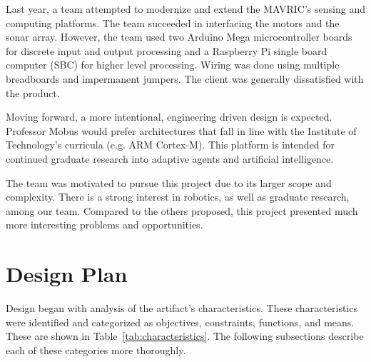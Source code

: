\documentclass{article}
\begin{document}
    Last year, a team attempted to modernize
    and extend the MAVRIC's sensing and computing platforms.\cite{mobot}
    The team succeeded in interfacing the motors and the sonar array.
    However, the team used two Arduino Mega microcontroller boards
    for discrete input and output processing
    and a Raspberry Pi single board computer (SBC) for higher level processing.
    Wiring was done using multiple breadboards and impermanent jumpers.
    The client was generally dissatisfied with the product.

    Moving forward, a more intentional, engineering driven design is expected.
    Professor Mobus would prefer architectures          %
    that fall in line with the Institute of Technology's curricula
    (e.g. ARM Cortex-M).
    This platform is intended for continued graduate research
    into adaptive agents and artificial intelligence.

    The team was motivated to pursue this project
    due to its larger scope and complexity.
    There is a strong interest in robotics, as well as graduate research,
    among our team.
    Compared to the others proposed,
    this project presented much more interesting problems and opportunities.

\FloatBarrier
\section{Design Plan} %
    \label{sec:design_plan}

    Design began with analysis of the artifact's characteristics.
    These characteristics were identified
    and categorized as objectives, constraints, functions, and means.
    These are shown in Table~\ref{tab:characteristics}.
    The following subsections describe each of these categories more thoroughly.
\end{document}
